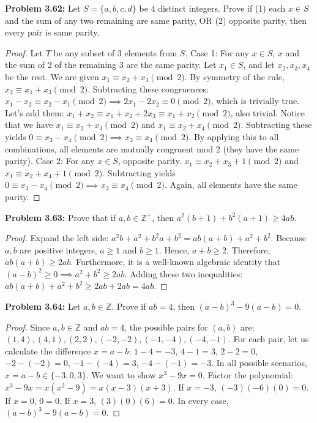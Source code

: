 \documentclass[11pt, letterpaper]{article}
\theoremstyle{definition}
\theoremstyle{remark}
\newcommand{\Z}{\mathbb{Z}}
\begin{document}
\textbf{Problem 3.62:} Let $S=\{a,b,c,d\}$ be 4 distinct integers. Prove if (1) each $x \in S$ and the sum of any two remaining are same parity, OR (2) opposite parity, then every pair is same parity.
\begin{proof}
Let $T$ be any subset of 3 elements from $S$. 
Case 1: For any $x \in S$, $x$ and the sum of 2 of the remaining 3 are the same parity. Let $x_1 \in S$, and let $x_2, x_3, x_4$ be the rest. We are given $x_1 \equiv x_2+x_3 \pmod 2$. By symmetry of the rule, $x_2 \equiv x_1+x_3 \pmod 2$. 
Subtracting these congruences: $x_1 - x_2 \equiv x_2 - x_1 \pmod 2 \implies 2x_1 - 2x_2 \equiv 0 \pmod 2$, which is trivially true. 
Let's add them: $x_1 + x_2 \equiv x_1 + x_2 + 2x_3 \equiv x_1 + x_2 \pmod 2$, also trivial.
Notice that we have $x_1 \equiv x_2+x_3 \pmod 2$ and $x_1 \equiv x_2+x_4 \pmod 2$. 
Subtracting these yields $0 \equiv x_3 - x_4 \pmod 2 \implies x_3 \equiv x_4 \pmod 2$. By applying this to all combinations, all elements are mutually congruent mod 2 (they have the same parity).
Case 2: For any $x \in S$, opposite parity. $x_1 \equiv x_2+x_3+1 \pmod 2$ and $x_1 \equiv x_2+x_4+1 \pmod 2$. Subtracting yields $0 \equiv x_3-x_4 \pmod 2 \implies x_3 \equiv x_4 \pmod 2$. Again, all elements have the same parity. 
\end{proof}

\textbf{Problem 3.63:} Prove that if $a, b \in \Z^+$, then $a^2(b+1) + b^2(a+1) \ge 4ab$.
\begin{proof}
Expand the left side:
$a^2b + a^2 + b^2a + b^2 = ab(a+b) + a^2 + b^2$.
Because $a,b$ are positive integers, $a \ge 1$ and $b \ge 1$. Hence, $a+b \ge 2$.
Therefore, $ab(a+b) \ge 2ab$. 
Furthermore, it is a well-known algebraic identity that $(a-b)^2 \ge 0 \implies a^2+b^2 \ge 2ab$.
Adding these two inequalities:
$ab(a+b) + a^2+b^2 \ge 2ab + 2ab = 4ab$.
\end{proof}

\textbf{Problem 3.64:} Let $a,b \in \Z$. Prove if $ab = 4$, then $(a-b)^3 - 9(a-b) = 0$.
\begin{proof}
Since $a,b \in \Z$ and $ab=4$, the possible pairs for $(a,b)$ are:
$(1,4), (4,1), (2,2), (-2,-2), (-1,-4), (-4,-1)$.
For each pair, let us calculate the difference $x = a-b$:
$1-4 = -3$, $4-1 = 3$, $2-2 = 0$, $-2-(-2)=0$, $-1-(-4)=3$, $-4-(-1)=-3$.
In all possible scenarios, $x = a-b \in \{-3, 0, 3\}$.
We want to show $x^3 - 9x = 0$. Factor the polynomial: $x^3 - 9x = x(x^2 - 9) = x(x-3)(x+3)$.
If $x=-3$, $(-3)(-6)(0) = 0$. If $x=0$, $0 = 0$. If $x=3$, $(3)(0)(6) = 0$.
In every case, $(a-b)^3 - 9(a-b) = 0$.
\end{proof}
\end{document}
